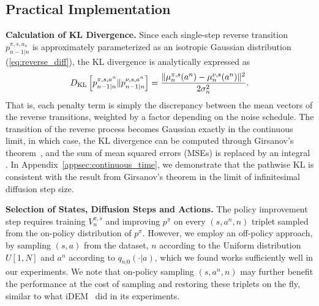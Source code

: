 \subsection{Practical Implementation}
\textbf{Calculation of KL Divergence. }
Since each single-step reverse transition $p_{n-1|n}^{\pi,s,a_n}$ is approximately parameterized as an isotropic Gaussian distribution (\eqref{eq:reverse_diff}), the KL divergence is analytically expressed as
\begin{equation}
    \begin{aligned}
        D_{\rm KL}\left[p^{\pi, s,a^n}_{n-1|n}\|p^{\nu, s,a^n}_{n-1|n}\right]=\frac{\|\mu^{\pi,s}_n(a^n)-\mu^{\nu,s}_n(a^n)\|^2}{2\sigma_n^2}.
    \end{aligned}
\end{equation}
That is, each penalty term is simply the discrepancy between the mean vectors of the reverse transitions, weighted by a factor depending on the noise schedule. The transition of the reverse process becomes Gaussian exactly in the continuous limit, in which case, the KL divergence can be computed through Girsanov's theorem~\citep{oksendal2013stochastic}, and the sum of mean squared errors (MSEs) is replaced by an integral \cite{minde}. In Appendix~\ref{appsec:continuous_time}, we demonstrate that the pathwise KL is consistent with the result from Girsanov's theorem in the limit of infinitesimal diffusion step size. 



\textbf{Selection of States, Diffusion Steps and Actions. }The policy improvement step requires training $V^{\pi,s}_n$ and improving $p^\pi$ on every $(s, a^n, n)$ triplet sampled from the on-policy distribution of $p^\pi$. However, we employ an off-policy approach, by sampling $(s, a)$ from the dataset, $n$ according to the Uniform distribution $U[1, N]$ and $a^n$ according to $q_{n|0}(\cdot|a)$, which we found works sufficiently well in our experiments. We note that on-policy sampling $(s, a^n, n)$ may further benefit the performance at the cost of sampling and restoring these triplets on the fly, similar to what iDEM~\citep{idem} did in its experiments. 


